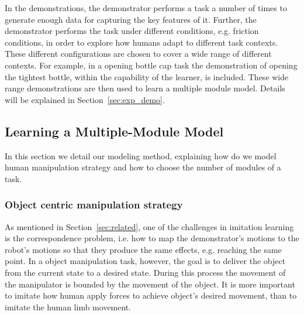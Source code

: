 
In the demonstrations, the demonstrator performs a task a number of times to generate enough data for capturing the key features of it. Further, the demonstrator performs the task under different conditions, e.g. friction conditions, in order to explore how humans adapt to different task contexts. These different configurations are chosen to cover a wide range of different contexts. For example, in a opening bottle cap task the demonstration of opening the tightest bottle, within the capability of the learner, is included. These wide range demonstrations are then used to learn a multiple module model. Details will be explained in Section~\ref{sec:exp_demo}.



\subsection{Learning a Multiple-Module Model}
\label{sec:learn}
In this section we detail our modeling method, explaining how do we model human manipulation strategy and how to choose the number of modules of a task.

\subsubsection{Object centric manipulation strategy}
\label{sec:objectlevel}
As mentioned in Section~\ref{sec:related}, one of the challenges in imitation learning is the correspondence problem, i.e. how to map the demonstrator's motions to the robot's motions so that they produce the same effects, e.g. reaching the same point. %
In a object manipulation task, however, the goal is to deliver the object from the current state to a desired state. During this process the movement of the manipulator is bounded by the movement of the object. It is more important to imitate how human apply forces to achieve object's desired movement, than to imitate the human limb movement.

